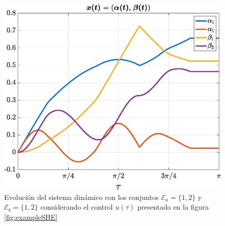 \begin{figure}[ht!]
	\centering
	\includegraphics[scale=0.35]{img/fig02.eps}
	\caption{Evolución del sistema dinámico con los conjuntos $\mathcal{E}_a = \{1,2\}$ y $\mathcal{E}_b = \{1,2\}$ considerando el control $u(\tau)$ presentado en la figura \ref{fig:exampleSHE}}
\end{figure}

